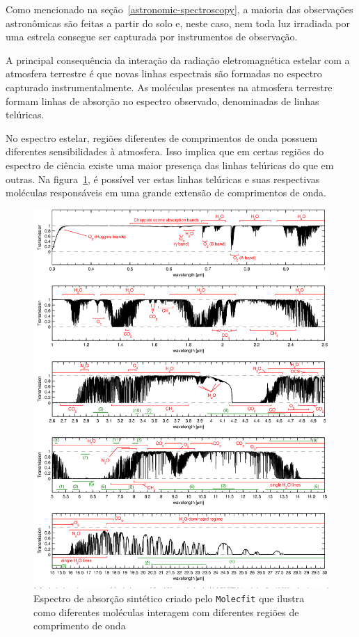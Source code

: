 Como mencionado na seção~\ref{astronomic-spectroscopy}, a maioria das observações astronômicas são feitas a partir do solo e, neste caso, nem toda luz irradiada por uma estrela consegue ser capturada por instrumentos de observação. 

A principal consequência da interação da radiação eletromagnética estelar com a atmosfera terrestre é que novas linhas espectrais são formadas no espectro capturado instrumentalmente. As moléculas presentes na atmosfera terrestre formam linhas de absorção no espectro observado, denominadas de linhas telúricas.  

No espectro estelar, regiões diferentes de comprimentos de onda possuem diferentes sensibilidades à atmosfera. Isso implica que em certas regiões do espectro de ciência existe uma maior presença das linhas telúricas do que em outras. Na figura~\ref{fig:molectfit-telluric-reference}, é possível ver estas linhas telúricas e suas respectivas moléculas responsáveis em uma grande extensão de comprimentos de onda.

\begin{figure}[!htb]
\centering
\includegraphics[width=15cm, trim=0 10 0 0, clip]{figuras/telluric_reference_molecfit.png}
\caption{Espectro de absorção sintético criado pelo \texttt{Molecfit} que ilustra como diferentes moléculas interagem com diferentes regiões de comprimento de onda \citep{smette2015molecfit}}
\label{fig:molectfit-telluric-reference}
\end{figure}

